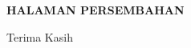 
\clearpage
{}
{}
\begin{center}
    \textbf{\large HALAMAN PERSEMBAHAN}\\[3em]
\end{center}


\begin{center}
    Terima Kasih
\end{center}

